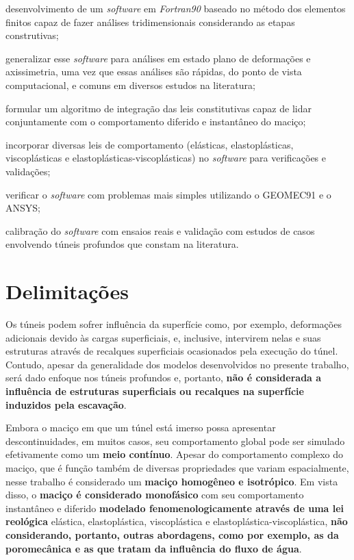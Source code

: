 \begin{alineas}
	
	\item desenvolvimento de um \textit{software} em \textit{Fortran90} baseado no método dos elementos finitos capaz de fazer análises tridimensionais considerando as etapas construtivas; 
	
	\item generalizar esse \textit{software} para análises em estado plano de deformações e axissimetria, uma vez que essas análises são rápidas, do ponto de vista computacional, e comuns em diversos estudos na literatura;
	
	\item formular um algoritmo de integração das leis constitutivas capaz de lidar conjuntamente com o comportamento diferido e instantâneo do maciço;
	
	\item incorporar diversas leis de comportamento (elásticas, elastoplásticas, viscoplásticas e elastoplásticas-viscoplásticas) no \textit{software} para verificações e validações;
	
	\item verificar o \textit{software} com problemas mais simples utilizando o GEOMEC91 e o ANSYS;
	
	\item calibração do \textit{software} com ensaios reais e validação com estudos de casos envolvendo túneis profundos que constam na literatura.
	
\end{alineas}

\section{Delimitações}
Os túneis podem sofrer influência da superfície como, por exemplo, deformações adicionais devido às cargas superficiais, e, inclusive, intervirem nelas e suas estruturas através de recalques superficiais ocasionados pela execução do túnel. Contudo, apesar da generalidade dos modelos desenvolvidos no presente trabalho, será dado enfoque nos túneis profundos e, portanto, \textbf{não é considerada a influência de estruturas superficiais ou recalques na superfície induzidos pela escavação}.

Embora o maciço em que um túnel está imerso possa apresentar descontinuidades, em muitos casos, seu comportamento global pode ser simulado efetivamente como um \textbf{meio contínuo}. Apesar do comportamento complexo do maciço, que é função também de diversas propriedades que variam espacialmente, nesse trabalho é considerado um \textbf{maciço homogêneo e isotrópico}. Em vista disso, o \textbf{maciço é considerado monofásico} com seu comportamento instantâneo e diferido \textbf{modelado fenomenologicamente através de uma lei reológica} elástica, elastoplástica, viscoplástica e elastoplástica-viscoplástica, \textbf{não considerando, portanto, outras abordagens, como por exemplo, as da poromecânica e as que tratam da influência do fluxo de água}.

